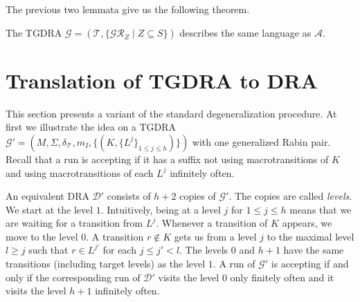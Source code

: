 \documentclass{llncs}
\newcommand{\mA}{\mathcal{A}}
\newcommand{\mD}{\mathcal{D}}
\newcommand{\mG}{\mathcal{G}}
\newcommand{\mGR}{\mathcal{GR}}
\newcommand{\mT}{\mathcal{T}}
\begin{document}
The previous two lemmata give us the following theorem.
\begin{theorem}
The TGDRA $\mG = (\mT,\{ \mGR_Z \mid Z \subseteq S\})$ describes the same
language as $\mA$.
\end{theorem}














\section{Translation of TGDRA to DRA}
This section presents a variant of the standard degeneralization procedure.  
At first we illustrate the idea on a TGDRA
$\mG'=(M,\Sigma,\delta_\mT,m_I,\{(K,\{L^j\}_{1\leq j \leq h})\})$ with one
generalized Rabin pair. Recall
that a run is accepting if it has a suffix not using macrotransitions of $K$
and using macrotransitions of each $L^j$ infinitely often.

An equivalent DRA $\mD'$ consists of $h+2$ copies of $\mG'$. The copies are
called \emph{levels}.  We start at the level $1$.  Intuitively, being at a
level $j$ for $1\le j\le h$ means that we are waiting for a transition from
$L^j$.  Whenever a transition of $K$ appears, we move to the level $0$.  A
transition $r\not\in K$ gets us from a level $j$ to the maximal level $l\ge
j$ such that $r\in L^{j'}$ for each $j\le j'< l$. The levels $0$ and $h+1$
have the same transitions (including target levels) as the level $1$. A run
of $\mG'$ is accepting if and only if the corresponding run of $\mD'$ visits
the level $0$ only finitely often and it visits the level $h+1$ infinitely
often.
\end{document}
